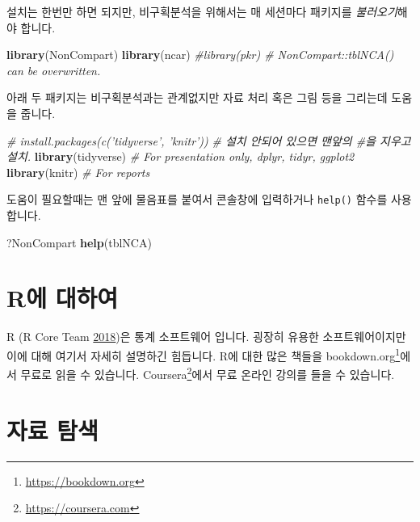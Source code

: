 \documentclass[9pt,]{krantz}
\newenvironment{Shaded}{\begin{snugshade}}{\end{snugshade}}
\newcommand{\CommentTok}[1]{\textcolor[rgb]{0.56,0.35,0.01}{\textit{#1}}}
\newcommand{\KeywordTok}[1]{\textcolor[rgb]{0.13,0.29,0.53}{\textbf{#1}}}
\newcommand{\NormalTok}[1]{#1}
\begin{document}
설치는 한번만 하면 되지만, 비구획분석을 위해서는 매 세션마다 패키지를 \emph{불러오기}해야 합니다.

\begin{Shaded}
\begin{Highlighting}[]
\KeywordTok{library}\NormalTok{(NonCompart)}
\KeywordTok{library}\NormalTok{(ncar)}
\CommentTok{#library(pkr) # NonCompart::tblNCA() can be overwritten.}
\end{Highlighting}
\end{Shaded}

아래 두 패키지는 비구획분석과는 관계없지만 자료 처리 혹은 그림 등을 그리는데 도움을 줍니다.

\begin{Shaded}
\begin{Highlighting}[]
\CommentTok{# install.packages(c('tidyverse', 'knitr')) }
\CommentTok{# 설치 안되어 있으면 맨앞의 #을 지우고 설치.}
\KeywordTok{library}\NormalTok{(tidyverse) }\CommentTok{# For presentation only, dplyr, tidyr, ggplot2}
\KeywordTok{library}\NormalTok{(knitr) }\CommentTok{# For reports}
\end{Highlighting}
\end{Shaded}

도움이 필요할때는 맨 앞에 물음표를 붙여서 콘솔창에 입력하거나 \texttt{help()} 함수를 사용합니다.

\begin{Shaded}
\begin{Highlighting}[]
\NormalTok{?NonCompart}
\KeywordTok{help}\NormalTok{(tblNCA)}
\end{Highlighting}
\end{Shaded}

\hypertarget{r-}{%
\section{R에 대하여}\label{r-}}

R (R Core Team \protect\hyperlink{ref-R-base}{2018})은 통계 소프트웨어 입니다.
굉장히 유용한 소프트웨어이지만 이에 대해 여기서 자세히 설명하긴 힘듭니다.
R에 대한 많은 책들을 bookdown.org\footnote{\url{https://bookdown.org}}에서 무료로 읽을 수 있습니다.
Coursera\footnote{\url{https://coursera.com}}에서 무료 온라인 강의를 들을 수 있습니다.

\hypertarget{section-1}{%
\section{자료 탐색}\label{section-1}}
\end{document}
